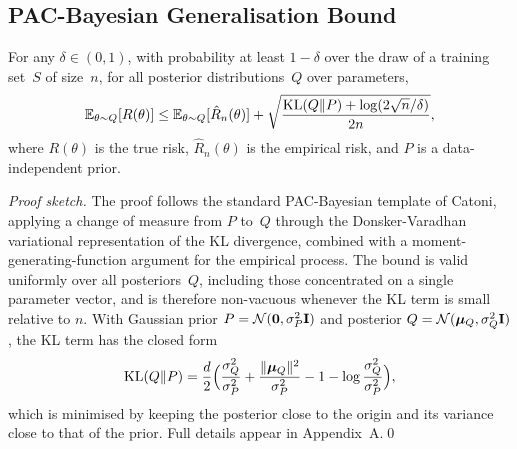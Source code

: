 \subsection{PAC-Bayesian Generalisation Bound}

\begin{theorem}
\label{thm:pac_bayes}
For any $\delta\in(0,1)$, with probability at least $1-\delta$ over the draw of a training set~$S$ of size~$n$, for all posterior distributions~$Q$ over parameters,
\begin{equation}
\mathbb{E}_{\theta\sim Q}[R(\theta)]
\le \mathbb{E}_{\theta\sim Q}[\hat{R}_n(\theta)]
+ \sqrt{\frac{\mathrm{KL}(Q\|P)+\log(2\sqrt{n}/\delta)}{2n}},
\label{eq:pac_bayes}
\end{equation}
where $R(\theta)$ is the true risk, $\hat{R}_n(\theta)$ is the empirical risk, and $P$ is a data-independent prior.
\end{theorem}

\noindent\textit{Proof sketch.} The proof follows the standard PAC-Bayesian template of Catoni, applying a change of measure from $P$ to~$Q$ through the Donsker-Varadhan variational representation of the KL divergence, combined with a moment-generating-function argument for the empirical process. The bound is valid uniformly over all posteriors~$Q$, including those concentrated on a single parameter vector, and is therefore non-vacuous whenever the KL term is small relative to $n$. With Gaussian prior $P=\mathcal{N}(\mathbf{0},\sigma_P^2\mathbf{I})$ and posterior $Q=\mathcal{N}(\bm{\mu}_Q,\sigma_Q^2\mathbf{I})$, the KL term has the closed form
\begin{equation}
\mathrm{KL}(Q\|P)
= \frac{d}{2}\Bigl(
  \frac{\sigma_Q^2}{\sigma_P^2}
  + \frac{\|\bm{\mu}_Q\|^2}{\sigma_P^2}
  - 1
  - \log\frac{\sigma_Q^2}{\sigma_P^2}
\Bigr),
\label{eq:pac_kl_gauss}
\end{equation}
which is minimised by keeping the posterior close to the origin and its variance close to that of the prior. Full details appear in Appendix~A.\qed

